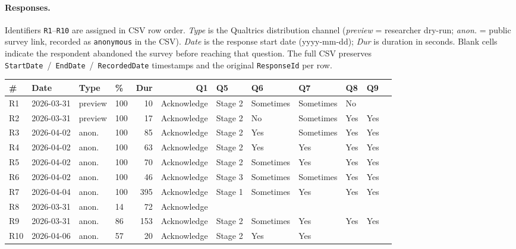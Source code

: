 \documentclass[a4paper,11pt]{article}
\begin{document}
\paragraph{Responses.} Identifiers \texttt{R1}--\texttt{R10} are
assigned in CSV row order. \emph{Type} is the Qualtrics distribution
channel (\emph{preview} = researcher dry-run; \emph{anon.} = public
survey link, recorded as \texttt{anonymous} in the CSV). \emph{Date}
is the response start date (yyyy-mm-dd); \emph{Dur} is duration in
seconds. Blank cells indicate the respondent abandoned the survey
before reaching that question. The full CSV preserves
\texttt{StartDate}~/~\texttt{EndDate}~/~\texttt{RecordedDate}
timestamps and the original \texttt{ResponseId} per row.

\begingroup
\footnotesize
\setlength{\tabcolsep}{3pt}
\renewcommand{\arraystretch}{1.15}
\begin{longtable}{@{}llllrrlllllc@{}}
\toprule
\textbf{\#} & \textbf{Date} & \textbf{Type} & \textbf{\%} &
\textbf{Dur} & \textbf{Q1} & \textbf{Q5} & \textbf{Q6} &
\textbf{Q7} & \textbf{Q8} & \textbf{Q9} \\
\midrule
\endhead
R1  & 2026-03-31 & preview & 100 & 10  & Acknowledge & Stage 2 & Sometimes & Sometimes & No  &     \\
R2  & 2026-03-31 & preview & 100 & 17  & Acknowledge & Stage 2 & No        & Sometimes & Yes & Yes \\
R3  & 2026-04-02 & anon.   & 100 & 85  & Acknowledge & Stage 2 & Yes       & Sometimes & Yes & Yes \\
R4  & 2026-04-02 & anon.   & 100 & 63  & Acknowledge & Stage 2 & Yes       & Yes       & Yes & Yes \\
R5  & 2026-04-02 & anon.   & 100 & 70  & Acknowledge & Stage 2 & Sometimes & Yes       & Yes & Yes \\
R6  & 2026-04-02 & anon.   & 100 & 46  & Acknowledge & Stage 3 & Sometimes & Sometimes & Yes & Yes \\
R7  & 2026-04-04 & anon.   & 100 & 395 & Acknowledge & Stage 1 & Sometimes & Yes       & Yes & Yes \\
R8  & 2026-03-31 & anon.   &  14 & 72  & Acknowledge &         &           &           &     &     \\
R9  & 2026-03-31 & anon.   &  86 & 153 & Acknowledge & Stage 2 & Sometimes & Yes       & Yes & Yes \\
R10 & 2026-04-06 & anon.   &  57 & 20  & Acknowledge & Stage 2 & Yes       & Yes       &     &     \\
\bottomrule
\end{longtable}
\endgroup
\end{document}
